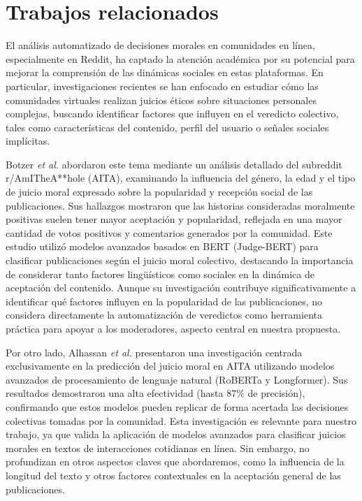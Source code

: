 \section{Trabajos relacionados}

El análisis automatizado de decisiones morales en comunidades en línea, especialmente en Reddit, ha captado la atención académica por su potencial para mejorar la comprensión de las dinámicas sociales en estas plataformas. En particular, investigaciones recientes se han enfocado en estudiar cómo las comunidades virtuales realizan juicios éticos sobre situaciones personales complejas, buscando identificar factores que influyen en el veredicto colectivo, tales como características del contenido, perfil del usuario o señales sociales implícitas.

Botzer \textit{et al.} \cite{botzer2023} abordaron este tema mediante un análisis detallado del subreddit r/AmITheA**hole (AITA), examinando la influencia del género, la edad y el tipo de juicio moral expresado sobre la popularidad y recepción social de las publicaciones. Sus hallazgos mostraron que las historias consideradas moralmente positivas suelen tener mayor aceptación y popularidad, reflejada en una mayor cantidad de votos positivos y comentarios generados por la comunidad. Este estudio utilizó modelos avanzados basados en BERT (Judge-BERT) para clasificar publicaciones según el juicio moral colectivo, destacando la importancia de considerar tanto factores lingüísticos como sociales en la dinámica de aceptación del contenido. Aunque su investigación contribuye significativamente a identificar qué factores influyen en la popularidad de las publicaciones, no considera directamente la automatización de veredictos como herramienta práctica para apoyar a los moderadores, aspecto central en nuestra propuesta.

Por otro lado, Alhassan \textit{et al.} \cite{alhassan2022} presentaron una investigación centrada exclusivamente en la predicción del juicio moral en AITA utilizando modelos avanzados de procesamiento de lenguaje natural (RoBERTa y Longformer). Sus resultados demostraron una alta efectividad (hasta 87\% de precisión), confirmando que estos modelos pueden replicar de forma acertada las decisiones colectivas tomadas por la comunidad. Esta investigación es relevante para nuestro trabajo, ya que valida la aplicación de modelos avanzados para clasificar juicios morales en textos de interacciones cotidianas en línea. Sin embargo, no profundizan en otros aspectos claves que abordaremos, como la influencia de la longitud del texto y otros factores contextuales en la aceptación general de las publicaciones.

